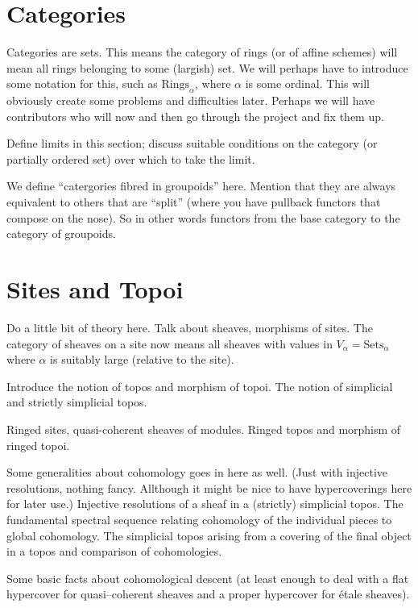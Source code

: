 \section{Categories}
\label{section-categories}

\noindent
Categories are sets. This means the category of rings (or of affine
schemes) will mean all rings belonging to some (largish) set. We will
perhaps have to introduce some notation for this, such as
$\text{Rings}_\alpha$, where $\alpha$ is some ordinal. This will
obviously create some problems and difficulties later. Perhaps we
will have contributors who will now and then go through the project and
fix them up.

\medskip\noindent
Define limits in this section; discuss suitable conditions on the
category (or partially ordered set) over which to take the limit.

\medskip\noindent
We define ``catergories fibred in groupoids'' here. Mention that they are
always equivalent to others that are ``split'' (where you have pullback
functors that compose on the nose). So in other words functors from the base
category to the category of groupoids.

\section{Sites and Topoi}
\label{section-sites}

\noindent
Do a little bit of theory here. Talk about sheaves, morphisms of sites.
The category of sheaves on a site now means all sheaves with values in
$V_\alpha = \text{Sets}_\alpha$ where $\alpha$ is suitably large (relative
to the site).

Introduce the notion of topos and morphism of topoi. The notion of
simplicial and strictly simplicial topos.

\medskip\noindent
Ringed sites, quasi-coherent sheaves of modules. Ringed topos and
morphism of ringed topoi.

\medskip\noindent
Some generalities about cohomology goes in here as well. (Just with
injective resolutions, nothing fancy. Allthough it might be nice to
have hypercoverings here for later use.) Injective resolutions of a
sheaf in a (strictly) simplicial topos.  The fundamental spectral
sequence relating cohomology of the individual pieces to global
cohomology. The simplicial topos arising from a covering of the final
object in a topos and comparison of cohomologies.

\medskip\noindent
Some basic facts about cohomological descent (at least enough to deal
with a flat hypercover for quasi--coherent sheaves and a proper
hypercover for \'etale sheaves).

